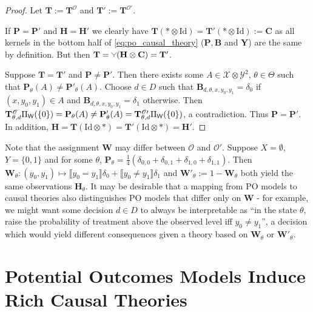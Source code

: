 \begin{proof}

Let $\mathbf{T}:=\mathbf{T}^{\mathscr{O}}$ and $\mathbf{T}':=\mathbf{T}^{\mathscr{O}'}$.

If $\mathbf{P}=\mathbf{P}'$ and $\mathbf{H}=\mathbf{H}'$ we clearly have $\mathbf{T}(*\otimes \mathrm{Id}) = \mathbf{T}'(*\otimes \mathrm{Id}):=\mathbf{C}$ as all kernels in the bottom half of \ref{eq:po_causal_theory} ($\mathbf{P},\mathbf{B}$ and $\mathbf{Y}$) are the same by definition. But then $\mathbf{T} = \splitter{0.1}(\mathbf{H}\otimes\mathbf{C}) = \mathbf{T}'$.

Suppose $\mathbf{T}=\mathbf{T}'$ and $\mathbf{P}\neq \mathbf{P}'$. Then there exists some $A\in \mathcal{X}\otimes\mathcal{Y}^2$, $\theta\in \Theta$ such that $\mathbf{P}_\theta (A) \neq \mathbf{P}'_\theta(A)$. Choose $d\in D$ such that $\mathbf{B}_{d,\theta,x,y_0,y_1} = \delta_0$ if $(x,y_0,y_1)\in A$ and $\mathbf{B}_{d,\theta,x,y_0,y_1} = \delta_1$ otherwise. Then $\mathbf{T}^\mathscr{O}_{\theta,d} \Pi_{\mathsf{W}} (\{0\})  =\mathbf{P}_\theta (A) \neq \mathbf{P}'_\theta(A) = \mathbf{T}^{\mathscr{O}\prime}_{\theta,d} \Pi_{\mathsf{W}} (\{0\})$, a contradiction. Thus $\mathbf{P}=\mathbf{P}'$. In addition, $\mathbf{H} = \mathbf{T}(\mathrm{Id}\otimes *) = \mathbf{T}'(\mathrm{Id}\otimes *) =\mathbf{H}'$.
\end{proof}

Note that the assignment $\mathbf{W}$ may differ between $\mathscr{O}$ and $\mathscr{O}'$. Suppose $X=\emptyset$, $Y=\{0,1\}$ and for some $\theta$, $\mathbf{P}_\theta = \frac{1}{4}(\delta_{0,0}+\delta_{0,1}+\delta_{1,0}+\delta_{1,1})$. Then $\mathbf{W}_\theta:(y_0,y_1)\mapsto \llbracket y_0=y_1\rrbracket\delta_0 + \llbracket y_0\neq y_1\rrbracket \delta_1$ and $\mathbf{W}'_\theta := 1-\mathbf{W}_\theta$ both yield the same observations $\mathbf{H}_\theta$. It may be desirable that a mapping from PO models to causal theories also distinguishes PO models that differ only on $\mathbf{W}$ - for example, we might want some decision $d\in D$ to always be interpretable as ``in the state $\theta$, raise the probability of treatment above the observed level iff $y_0\neq y_1$'', a decision which would yield different consequences given a theory based on $\mathbf{W}_\theta$ or $\mathbf{W}'_\theta$. 

\section{Potential Outcomes Models Induce Rich Causal Theories}

